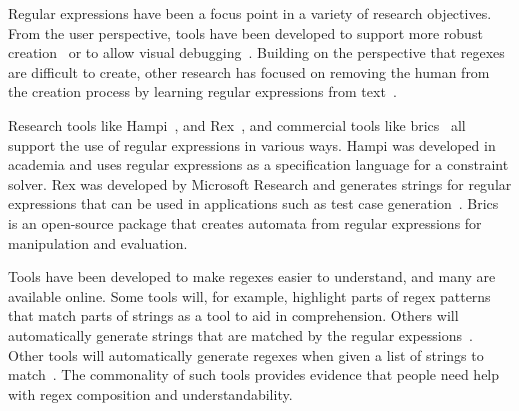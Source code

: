 

Regular expressions have been a focus point in a variety of research objectives. From the user perspective, tools have been developed to support more robust creation~\cite{Spishak:2012:TSR:2318202.2318207} or to allow visual debugging~\cite{Beck:2014:RVD:2591062.2591111}.
Building on the perspective that regexes are difficult to create, other research has focused on removing the human from the creation process by learning regular expressions from  text~\cite{Babbar:2010:CBA:1871840.1871848, Li:2008:REL:1613715.1613719}.

Research tools like Hampi~\cite{hampi}, and Rex~\cite{rex}, and commercial tools like brics~\cite{brics} all support the use of regular expressions in various ways. Hampi was developed  in academia and uses regular expressions as a specification language for a constraint solver. Rex was developed by Microsoft Research and generates strings for regular expressions that can be used in  applications such as test case generation~\cite{Anand:2013:OSM:2503903.2503991, Tillmann:2014:TAT:2642937.2642941}. Brics is an open-source package that creates automata from regular expressions for manipulation and evaluation.


Tools have been developed to make regexes easier to understand, and many are available online.
Some tools will, for example, highlight parts of regex patterns that match parts of strings as a tool to aid in comprehension.
Others will automatically generate strings that are matched by the regular expessions~\cite{hampi}.
Other tools will automatically generate regexes when given a list of strings to match~\cite{Babbar:2010:CBA:1871840.1871848, Li:2008:REL:1613715.1613719}.
The commonality of such tools provides evidence that people need help with regex composition and understandability.

